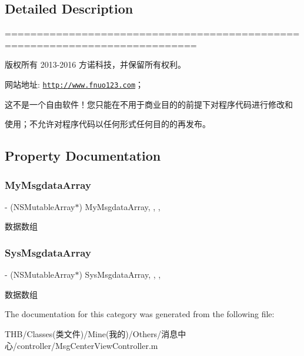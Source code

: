 \subsection{Detailed Description}
============================================================================

版权所有 2013-\/2016 方诺科技，并保留所有权利。

网站地址\+: \href{http://www.fnuo123.com}{\tt http\+://www.\+fnuo123.\+com}； 



这不是一个自由软件！您只能在不用于商业目的的前提下对程序代码进行修改和

使用；不允许对程序代码以任何形式任何目的的再发布。 

 

\subsection{Property Documentation}
\mbox{\label{category_msg_center_view_controller_07_08_a9e7bb45ff4b7d3f25fc3175affa1e5fe}} 
\subsubsection{\texorpdfstring{My\+Msgdata\+Array}{MyMsgdataArray}}
{\footnotesize\ttfamily -\/ (N\+S\+Mutable\+Array$\ast$) My\+Msgdata\+Array\hspace{0.3cm}{\ttfamily [read]}, {\ttfamily [write]}, {\ttfamily [nonatomic]}, {\ttfamily [strong]}}

数据数组 \mbox{\label{category_msg_center_view_controller_07_08_aed0c0e3673c8dcac2e6492dae1453d46}} 
\subsubsection{\texorpdfstring{Sys\+Msgdata\+Array}{SysMsgdataArray}}
{\footnotesize\ttfamily -\/ (N\+S\+Mutable\+Array$\ast$) Sys\+Msgdata\+Array\hspace{0.3cm}{\ttfamily [read]}, {\ttfamily [write]}, {\ttfamily [nonatomic]}, {\ttfamily [strong]}}

数据数组 

The documentation for this category was generated from the following file\+:\begin{DoxyCompactItemize}
\item 
T\+H\+B/\+Classes(类文件)/\+Mine(我的)/\+Others/消息中心/controller/Msg\+Center\+View\+Controller.\+m\end{DoxyCompactItemize}
